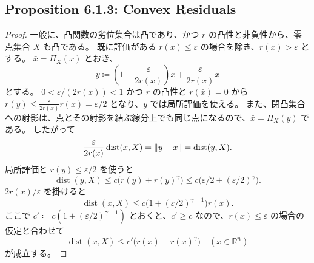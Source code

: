 \documentclass[12pt,dvipdfmx]{article}
\theoremstyle{plain}
\begin{document}
\subsection{Proposition 6.1.3: Convex Residuals}
\label{sec:error-convex}


\begin{proof}
    一般に、凸関数の劣位集合は凸であり、かつ $r$ の凸性と非負性から、零点集合 $X$ も凸である。
    既に評価がある $r(x) \leq \varepsilon$ の場合を除き、$r(x) > \varepsilon$ とする。
    $\bar x = \Pi_X(x)$ とおき、
    \begin{equation*}
        y \coloneqq \left(1 - \frac{\varepsilon}{2r(x)}\right)\bar x
        + \frac{\varepsilon}{2r(x)}x
    \end{equation*}
    とする。
    $0 < \varepsilon/(2r(x)) < 1$ かつ $r$ の凸性と $r(\bar x) = 0$ から $r(y) \leq \frac{\varepsilon}{2r(x)}r(x) = \varepsilon/2$ となり、$y$ では局所評価を使える。
    また、閉凸集合への射影は、点とその射影を結ぶ線分上でも同じ点になるので、$\bar x = \Pi_X(y)$ である。
    したがって
    \begin{equation*}
        \frac{\varepsilon}{2r(x)}\operatorname{dist}(x, X)
        = \norm{y - \bar x} = \operatorname{dist}(y, X).
    \end{equation*}
    局所評価と $r(y) \leq \varepsilon/2$ を使うと
    \begin{equation*}
        \operatorname{dist}(y, X)
        \leq c\bigl(r(y) + r(y)^{\gamma}\bigr)
        \leq c\bigl(\varepsilon/2 + (\varepsilon/2)^{\gamma}\bigr).
    \end{equation*}
    $2r(x)/\varepsilon$ を掛けると
    \begin{equation*}
        \operatorname{dist}(x, X)
        \leq c\bigl(1 + (\varepsilon/2)^{\gamma - 1}\bigr) r(x).
    \end{equation*}
    ここで $c' \coloneqq c(1 + (\varepsilon/2)^{\gamma - 1})$ とおくと、$c' \geq c$ なので、$r(x) \leq \varepsilon$ の場合の仮定と合わせて
    \begin{equation*}
        \operatorname{dist}(x, X) \leq c'\bigl(r(x) + r(x)^\gamma\bigr)
        \quad (x \in \mathbb{R}^n)
    \end{equation*}
    が成立する。
\end{proof}
\end{document}
